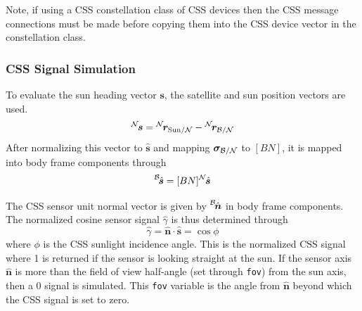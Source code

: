 Note, if using a CSS constellation class of CSS devices then the CSS message connections must be made before copying them into the CSS device vector in the constellation class.


\subsubsection{CSS Signal Simulation}
To evaluate the sun heading vector $\bm s$, the satellite and sun position vectors are used.
\begin{equation}
	\leftexp{N}{\bm s} = \leftexp{N}{\bm r}_{\mathrm{Sun}/\mathcal{N}} - \leftexp{N}{\bm r}_{\cal B/N}
\end{equation}
After normalizing this vector to $\hat{\bm s}$ and mapping $\bm\sigma_{\cal B/N}$ to $[BN]$, it is mapped into body frame components through
\begin{equation}
	\leftexp{B}{\hat{\bm s}} = [BN] \leftexp{N}{\hat{\bm s}}
\end{equation}

The CSS sensor unit normal vector is given by $\leftexp{B}{\hat{\bm n}}$ in body frame components.  The normalized cosine sensor signal $\hat\gamma$ is thus determined through
\begin{equation}
	\hat \gamma = \hat{\bm n} \cdot \hat{\bm s} = \cos\phi
\end{equation}
where $\phi$ is the CSS sunlight incidence angle.  
This is the normalized CSS signal where 1 is returned if the sensor is looking straight at the sun.  If the sensor axis $\hat{\bm n}$ is more than the field of view half-angle (set through {\tt fov}) from the sun axis, then a 0 signal is simulated.  This {\tt fov} variable is the angle from $\hat{\bm n}$ beyond which the CSS signal is set to zero.  

